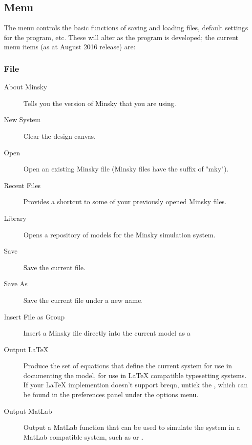\subsection{Menu}
\label{Menu}



The menu controls the basic functions of saving and loading files,
default settings for the program, etc. These will alter as the program
is developed; the current menu items (as at August 2016 release) are:

\subsubsection{File}
\label{File}

\begin{description}
\item[About Minsky] Tells you the version of Minsky that you are using.

\item[New System] Clear the design canvas.

\item[Open] Open an existing Minsky file (Minsky files have the suffix of "mky").

\item[Recent Files]\label{recentfiles} Provides a shortcut to some of
your previously opened Minsky files.

\item[Library] Opens a repository of models for the Minsky simulation system.

\item[Save] Save the current file.

\item[Save As] Save the current file under a new name.

\item[Insert File as Group] Insert a Minsky file directly into the
current model as a 

\item[Output LaTeX] Produce the set of equations that define the
  current system for use in documenting the model, for use in LaTeX
  compatible typesetting systems. If your LaTeX implemention doesn't
  support breqn, untick the , which can be found in the preferences panel under the options menu.

\item[Output MatLab] Output a MatLab function that can be used to
simulate the system in a MatLab compatible system, such as
or .


\end{description}
